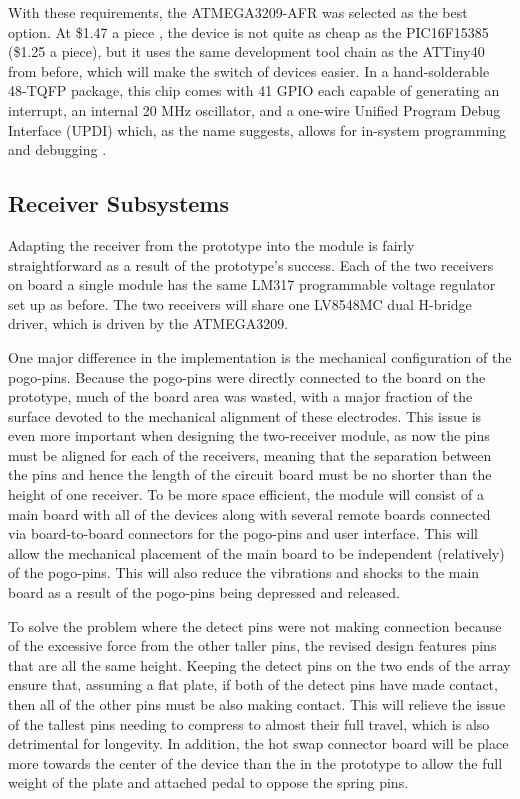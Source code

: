 \documentclass{article}
\begin{document}
	With these requirements, the ATMEGA3209-AFR was selected as the best option.  At \$1.47 a piece \cite{digikey}, the device is not quite as cheap as the PIC16F15385 (\$1.25 a piece), but it uses the same development tool chain as the ATTiny40 from before, which will make the switch of devices easier.  In a hand-solderable 48-TQFP package, this chip comes with 41 GPIO each capable of generating an interrupt, an internal 20 MHz oscillator, and a one-wire Unified Program Debug Interface (UPDI) which, as the name suggests, allows for in-system programming and debugging \cite{ATMEGA3209_datasheet}.

	\subsection{Receiver Subsystems}

	\color{black}

	Adapting the receiver from the prototype into the module is fairly straightforward as a result of the prototype's success.  Each of the two receivers on board a single module has the same LM317 programmable voltage regulator set up as before.  The two receivers will share one LV8548MC dual H-bridge driver, which is driven by the ATMEGA3209.

	One major difference in the implementation is the mechanical configuration of the pogo-pins.  Because the pogo-pins were directly connected to the board on the prototype, much of the board area was wasted, with a major fraction of the surface devoted to the mechanical alignment of these electrodes.  This issue is even more important when designing the two-receiver module, as now the pins must be aligned for each of the receivers, meaning that the separation between the pins and hence the length of the circuit board must be no shorter than the height of one receiver.  To be more space efficient, the module will consist of a main board with all of the devices along with several remote boards connected via board-to-board connectors for the pogo-pins and user interface.  This will allow the mechanical placement of the main board to be independent (relatively) of the pogo-pins.  This will also reduce the vibrations and shocks to the main board as a result of the pogo-pins being depressed and released.

	To solve the problem where the detect pins were not making connection because of the excessive force from the other taller pins, the revised design features pins that are all the same height.  Keeping the detect pins on the two ends of the array ensure that, assuming a flat plate, if both of the detect pins have made contact, then all of the other pins must be also making contact.  This will relieve the issue of the tallest pins needing to compress to almost their full travel, which is also detrimental for longevity.  In addition, the hot swap connector board will be place more towards the center of the device than the in the prototype to allow the full weight of the plate and attached pedal to oppose the spring pins.
\end{document}

